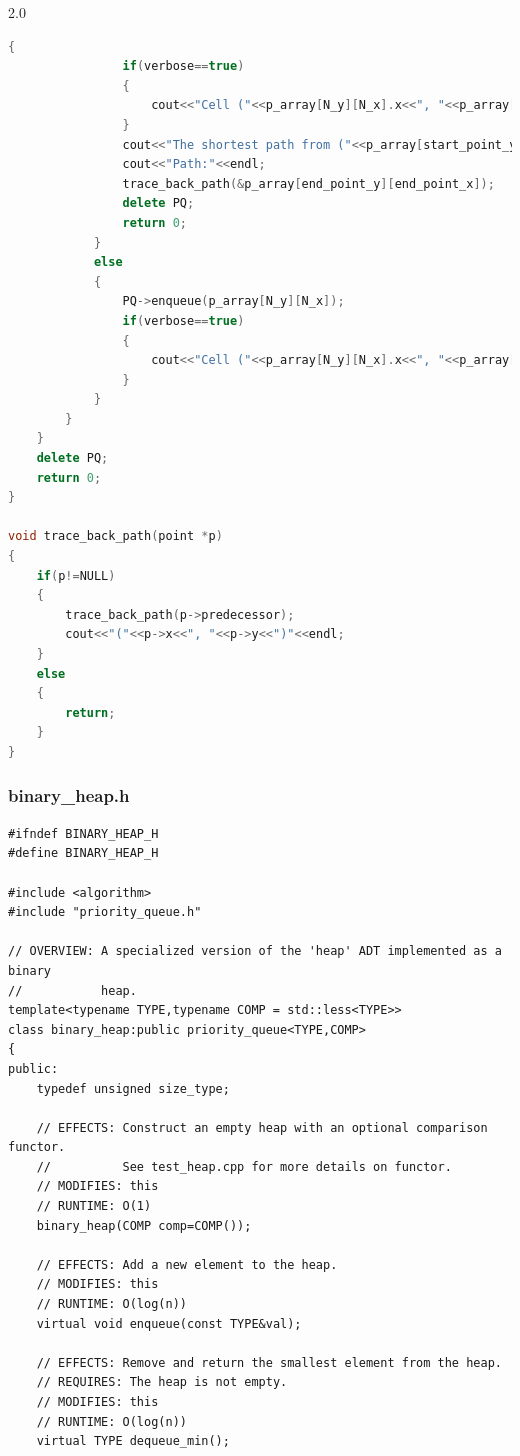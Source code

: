 \documentclass{article}
\begin{document}
\begin{spacing}{2.0}
\begin{lstlisting}[language=c++]
            {
                if(verbose==true)
                {
                    cout<<"Cell ("<<p_array[N_y][N_x].x<<", "<<p_array[N_y][N_x].y<<") with accumulated length "<<p_array[N_y][N_x].pathcost<<" is the ending point."<<endl;
                }
                cout<<"The shortest path from ("<<p_array[start_point_y][start_point_x].x<<", "<<p_array[start_point_y][start_point_x].y<<") to ("<<p_array[end_point_y][end_point_x].x<<", "<<p_array[end_point_y][end_point_x].y<<") is "<<p_array[N_y][N_x].pathcost<<"."<<endl;
                cout<<"Path:"<<endl;
                trace_back_path(&p_array[end_point_y][end_point_x]);
                delete PQ;
                return 0;
            }
            else
            {
                PQ->enqueue(p_array[N_y][N_x]);
                if(verbose==true)
                {
                    cout<<"Cell ("<<p_array[N_y][N_x].x<<", "<<p_array[N_y][N_x].y<<") with accumulated length "<<p_array[N_y][N_x].pathcost<<" is added into the queue."<<endl;
                }
            }
        }
    }
    delete PQ;
    return 0;
}

void trace_back_path(point *p)
{
    if(p!=NULL)
    {
        trace_back_path(p->predecessor);
        cout<<"("<<p->x<<", "<<p->y<<")"<<endl;
    }
    else
    {
        return;
    }
}
\end{lstlisting}
\subsubsection{binary\_heap.h}
\begin{lstlisting}
#ifndef BINARY_HEAP_H
#define BINARY_HEAP_H

#include <algorithm>
#include "priority_queue.h"

// OVERVIEW: A specialized version of the 'heap' ADT implemented as a binary
//           heap.
template<typename TYPE,typename COMP = std::less<TYPE>>
class binary_heap:public priority_queue<TYPE,COMP>
{
public:
    typedef unsigned size_type;

    // EFFECTS: Construct an empty heap with an optional comparison functor.
    //          See test_heap.cpp for more details on functor.
    // MODIFIES: this
    // RUNTIME: O(1)
    binary_heap(COMP comp=COMP());

    // EFFECTS: Add a new element to the heap.
    // MODIFIES: this
    // RUNTIME: O(log(n))
    virtual void enqueue(const TYPE&val);

    // EFFECTS: Remove and return the smallest element from the heap.
    // REQUIRES: The heap is not empty.
    // MODIFIES: this
    // RUNTIME: O(log(n))
    virtual TYPE dequeue_min();


\end{lstlisting}
\end{spacing}
\end{document}
